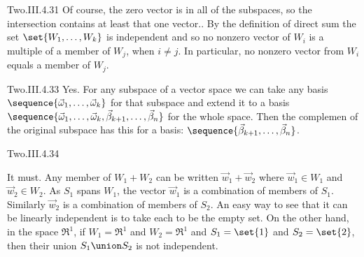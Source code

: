 \begin{ans}{Two.III.4.31}
      Of course, the zero vector is in all of the subspaces, so the
      intersection contains at least that one vector..
      By the definition of direct sum the set
      \( \set{W_1,\dots,W_k} \) is independent and so no nonzero vector
      of \( W_i \) is a multiple of a member of \( W_j \), when
      \( i\neq j \).
      In particular, no nonzero vector from \( W_i \) equals a member of
      \( W_j \).
    
\end{ans}
\begin{ans}{Two.III.4.33}
      Yes.
      For any subspace of a vector space we can take any
      basis \( \sequence{\vec{\omega}_1,\dots,\vec{\omega}_k} \) for that
      subspace and extend it to a basis
      \( \sequence{\vec{\omega}_1,\dots,\vec{\omega}_k,
                     \vec{\beta}_{k+1},\dots,\vec{\beta}_n} \) for the whole
      space.
      Then the complemen of the original subspace has this for a basis:
      \( \sequence{\vec{\beta}_{k+1},\dots,\vec{\beta}_n} \).
     
\end{ans}
\begin{ans}{Two.III.4.34}
      \begin{exparts}
        \partsitem It must.
          Any member of \( W_1+W_2 \) can be written \( \vec{w}_1+\vec{w}_2 \)
          where \( \vec{w}_1\in W_1 \) and \( \vec{w}_2\in W_2 \).
          As \( S_1 \) spans \( W_1 \), the vector \( \vec{w}_1 \) is a
          combination of members of \( S_1 \).
          Similarly \( \vec{w}_2 \) is a combination of members of \( S_2 \).
        \partsitem An easy way to see that it can be linearly independent
          is to take each to be the empty set.
          On the other hand, in the space $\Re^1$,
          if \( W_1=\Re^1 \) and \( W_2=\Re^1 \) and $S_1=\set{1}$ and
          $S_2=\set{2}$, then their union $S_1\union S_2$ is not independent.
      \end{exparts}
     
\end{ans}

